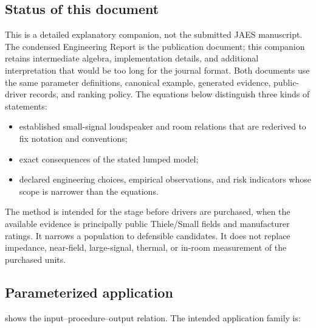 \documentclass[11pt,a4paper]{article}
\numberwithin{equation}{section}
\begin{document}
\subsection{Status of this document}

This is a detailed explanatory companion, not the submitted JAES manuscript.
The condensed Engineering Report is the publication document; this companion
retains intermediate algebra, implementation details, and additional
interpretation that would be too long for the journal format.  Both documents
use the same parameter definitions, canonical example, generated evidence,
public-driver records, and ranking policy.  The equations below distinguish
three kinds of statements:

\begin{itemize}
	\item established small-signal loudspeaker and room relations that are
	rederived to fix notation and conventions;
	\item exact consequences of the stated lumped model;
	\item declared engineering choices, empirical observations, and risk
	indicators whose scope is narrower than the equations.
\end{itemize}

The method is intended for the stage before drivers are purchased, when the
available evidence is principally public Thiele/Small fields and manufacturer
ratings.  It narrows a population to defensible candidates.  It does not
replace impedance, near-field, large-signal, thermal, or in-room measurement
of the purchased units.

\subsection{Parameterized application}
\label{sec:intro-arch}

 shows the input--procedure--output relation.  The
intended application family is:
\end{document}
